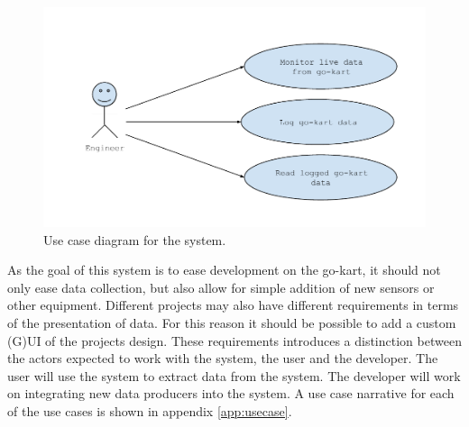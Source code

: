\begin{figure}[h]
 	\centering
    \includegraphics[width=1\textwidth]{graphics/use_cases}
    \caption{Use case diagram for the system.}
    \label{fig:usecases}
\end{figure}

As the goal of this system is to ease development on the go-kart, it should not only ease data collection, but also allow for simple addition of new sensors or other equipment.
Different projects may also have different requirements in terms of the presentation of data.
For this reason it should be possible to add a custom (G)UI of the projects design.
These requirements introduces a distinction between the actors expected to work with the system, the user and the developer.
The user will use the system to extract data from the system.
The developer will work on integrating new data producers into the system.
A use case narrative for each of the use cases is shown in appendix \ref{app:usecase}.